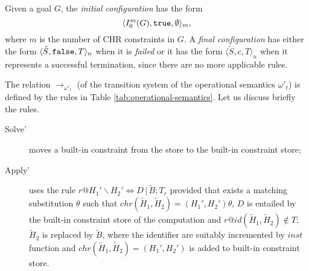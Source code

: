 \documentclass[final]{acmtrans2e}
\newcommand{\rrarrow}{\longrightarrow}
\begin{document}
Given a goal $G$, the  {\em initial configuration} has the form
\[\langle I_0^m(G),{\tt true}, \emptyset \rangle_m,\]
where $m$ is the number of CHR constraints in $G$. A {\em final
configuration} has either the form $\langle \tilde S, {\tt false}
, T\rangle_n$ when it is {\em failed} or it has the form $\langle
\tilde S, c,T \rangle_n$ when it represents a successful
termination, since there are no more applicable rules.

The relation $\rrarrow_{\omega'_t}$ (of the transition system of
the operational semantics $\omega'_t$) is defined  by the rules in
Table \ref{tab:operational-semantics}.  Let us discuss briefly
the rules.

\begin{description}
\item[Solve']{moves a built-in constraint from the store to the
built-in constraint store;}

\item[Apply']{uses the rule $r@H_1'\backslash H_2'\Leftrightarrow
D \, |\, \tilde B; T_r$ provided that exists a matching
substitution $\theta$ such that $chr(\tilde H_1,\tilde H_2)=
(H_1',H_2')\theta$, $D$ is entailed by the built-in constraint
store of the computation and $r@id(\tilde H_1, \tilde H_2)\not \in
T$; $\tilde H_2$ is replaced by $\tilde B$, where the identifier
are suitably incremented by $inst$ function and $chr (\tilde
H_1,\tilde H_2)= (H_1',H_2')$ is added to built-in constraint
store.}
\end{description}
\end{document}
